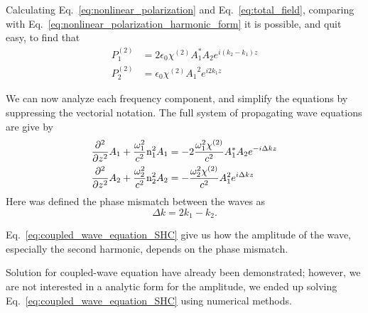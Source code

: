 Calculating Eq.~\ref{eq:nonlinear_polarization} and Eq.~\ref{eq:total_field}, comparing with Eq.~\ref{eq:nonlinear_polarization_harmonic_form} it is possible, and quit easy, to find that
\begin{subequations}
    \begin{align}
        P^{(2)}_1 &= 2\epsilon_0\chi^{(2)} A^*_1 A_2e^{i(k_2-k_1)z}\\
        P^{(2)}_2 &= \epsilon_0\chi^{(2)} {A_1}^2e^{i2k_1z}
    \end{align}
\end{subequations}


We can now analyze each frequency component, and simplify the equations by suppressing the vectorial notation. The full system of propagating wave equations are give by 
\begin{subequations}
    \begin{align}
       \frac{\partial^2}{\partial z^2}A_1 +\frac{\omega_1^2}{c^2}\text{n}_1^2 A_1 &= -2\frac{\omega_1^2 \chi^{(2)}}{c^2} A^*_1 A_2e^{-i\Delta kz}\\
       \frac{\partial^2}{\partial z^2}A_2 +\frac{\omega_2^2}{c^2}\text{n}_2^2 A_2 &= -\frac{\omega_2^2\chi^{(2)}}{c^2} A_1^2e^{i\Delta k z}
    \end{align}
    \label{eq:coupled_wave_equation_SHC}
\end{subequations}
Here was defined the phase mismatch between the waves as
\begin{equation}
    \Delta k = 2k_1 - k_2.
\end{equation}

Eq.~\ref{eq:coupled_wave_equation_SHC} give us how the amplitude of the wave, especially the second harmonic, depends on the phase mismatch. 

Solution for coupled-wave equation have already been demonstrated; however, we are not interested in a analytic form for the amplitude, we ended up solving Eq.~\ref{eq:coupled_wave_equation_SHC} using numerical methods.

